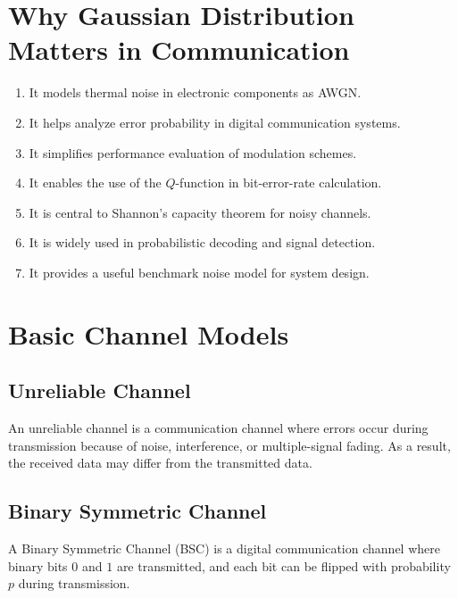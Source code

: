 \documentclass[11pt,a4paper]{book}
\newenvironment{definitionbox}[1][Definition]{%
    \begin{tcolorbox}[
        enhanced,
        breakable,
        colback=primaryblue!10,
        colframe=primaryblue!150,
        title=#1,
        fonttitle=\bfseries,
        sharp corners,
        boxrule=0.8pt,
        left=8pt,
        right=8pt,
        top=6pt,
        bottom=6pt
    ]
}{\end{tcolorbox}}
\begin{document}
\section{Why Gaussian Distribution Matters in Communication}

\begin{enumerate}
    \item It models thermal noise in electronic components as AWGN.
    \item It helps analyze error probability in digital communication systems.
    \item It simplifies performance evaluation of modulation schemes.
    \item It enables the use of the \(Q\)-function in bit-error-rate calculation.
    \item It is central to Shannon's capacity theorem for noisy channels.
    \item It is widely used in probabilistic decoding and signal detection.
    \item It provides a useful benchmark noise model for system design.
\end{enumerate}

\section{Basic Channel Models}

\subsection{Unreliable Channel}

\begin{definitionbox}[Unreliable Channel]
An unreliable channel is a communication channel where errors occur during transmission because of noise, interference, or multiple-signal fading. As a result, the received data may differ from the transmitted data.
\end{definitionbox}

\subsection{Binary Symmetric Channel}

\begin{definitionbox}[Binary Symmetric Channel]
A Binary Symmetric Channel (BSC) is a digital communication channel where binary bits \(0\) and \(1\) are transmitted, and each bit can be flipped with probability \(p\) during transmission.
\end{definitionbox}
\end{document}

